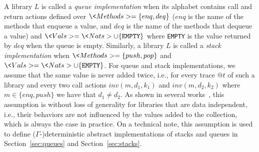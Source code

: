 A library $L$ is called a \emph{queue implementation} when its alphabet contains call and return actions defined over $\<Methods>=\{enq,deq\}$ ($enq$ is the name of the methods that enqueue a value, and $deq$ is the name of the methods that dequeue a value) and $\<Vals>=\<Nats>\cup\{{\tt EMPTY}\}$ where {\tt EMPTY} is the value returned by $deq$ when the queue is empty. Similarly, a library $L$ is called a \emph{stack implementation} when $\<Methods>=\{push,pop\}$ and  $\<Vals>=\<Nats>\cup\{{\tt EMPTY}\}$. For queue and stack implementations, we assume that the same value is never added twice, i.e., for every trace $@t$ of such a library and every two call actions $inv(m,d_1,k_1)$ and $inv(m,d_2,k_2)$ where $m\in \{enq,push\}$ we have that $d_1\neq d_2$. As shown in several works~\cite{conf/tacas/AbdullaHHJR13,DBLP:conf/icalp/BouajjaniEEH15}, this assumption is without loss of generality for libraries that are data independent, i.e., their behaviors are not influenced by the values added to the collection, which is always the case in practice. On a technical note, this assumption is used to define ($\Gamma$-)deterministic abstract implementations of stacks and queues in Section~\ref{sec:queues} and Section~\ref{sec:stacks}.


%
%
%  




